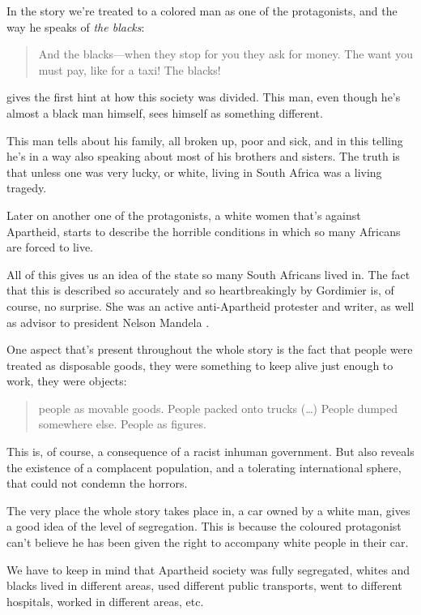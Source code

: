 \documentclass{scrartcl}
\begin{document}
In the story we're treated to a colored man as one of the protagonists,
and the way he speaks of \textit{the blacks}:
\begin{quote}
  And the blacks---when they stop for you they ask for money.
  The want you must pay, like for a taxi! The blacks! \cite[Page 213--214]{nadine_dreaming}
\end{quote}
gives the first hint at how this society was divided.
This man, even though he's almost a black man himself,
sees himself as something different.

This man tells about his family, all broken up, poor and sick,
and in this telling he's in a way also speaking
about most of his brothers and sisters.
The truth is that unless one was very lucky,
or white,
living in South Africa was a living tragedy.

Later on another one of the protagonists,
a white women that's against Apartheid,
starts to describe the horrible conditions in which
so many Africans are forced to live.

All of this gives us an idea of the state so many South Africans lived in.
The fact that this is described so accurately and so heartbreakingly
by Gordimier is, of course, no surprise. She was an active anti-Apartheid
protester and writer, as well as advisor to president Nelson Mandela \cite[Second paragraph]{noauthor_nadine_2021}.

One aspect that's present throughout the whole story
is the fact that people were treated as disposable goods,
they were something to keep alive just enough to work,
they were objects:
\begin{quote}
  people as movable goods. People packed onto trucks (\dots)
  People dumped somewhere else. People as figures. \cite[Page 219]{nadine_dreaming}
\end{quote}

This is, of course, a consequence of a racist inhuman government.
But also reveals the existence of a complacent population,
and a tolerating international sphere,
that could not condemn the horrors.

The very place the whole story takes place in,
a car owned by a white man,
gives a good idea of the level of segregation.
This is because the coloured protagonist
can't believe he has been given the right to accompany
white people in their car.

We have to keep in mind that Apartheid society was fully segregated,
whites and blacks lived in different areas, used different public transports,
went to different hospitals, worked in different areas, etc.
\end{document}
